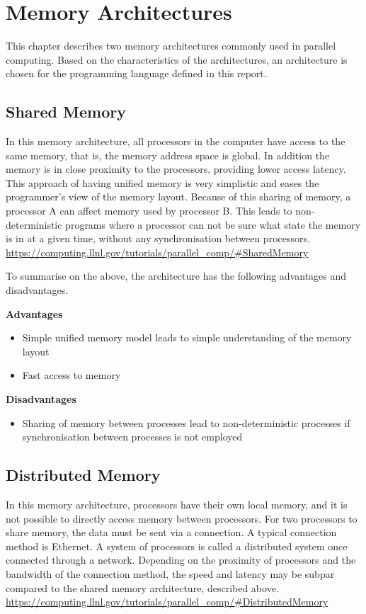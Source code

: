 \chapter{Memory Architectures}

This chapter describes two memory architectures commonly used in parallel computing. Based on the characteristics of the architectures, an architecture is chosen for the programming language defined in this report.

\section{Shared Memory}

In this memory architecture, all processors in the computer have access to the same memory, that is, the memory address space is global. In addition the memory is in close proximity to the processors, providing lower access latency. This approach of having unified memory is very simplistic and eases the programmer's view of the memory layout.
Because of this sharing of memory, a processor A can affect memory used by processor B. This leads to non-deterministic programs where a processor can not be sure what state the memory is in at a given time, without any synchronisation between processors. \url{https://computing.llnl.gov/tutorials/parallel_comp/#SharedMemory}

To summarise on the above, the architecture has the following advantages and disadvantages. 

\noindent\textbf{Advantages}
\begin{itemize}
    \item Simple unified memory model leads to simple understanding of the memory layout
    \item Fast access to memory
\end{itemize}

\noindent\textbf{Disadvantages}
\begin{itemize}
    \item Sharing of memory between processes lead to non-deterministic processes if synchronisation between processes is not employed
\end{itemize}

\section{Distributed Memory}

In this memory architecture, processors have their own local memory, and it is not possible to directly access memory between processors.
For two processors to share memory, the data must be sent via a connection. A typical connection method is Ethernet. A system of processors is called a distributed system once connected through a network. Depending on the proximity of processors and the bandwidth of the connection method, the speed and latency may be subpar compared to the shared memory architecture, described above. \url{https://computing.llnl.gov/tutorials/parallel_comp/#DistributedMemory}

